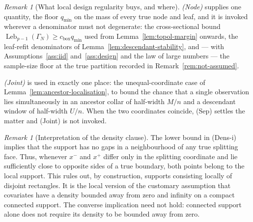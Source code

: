 \documentclass[11pt]{article}
\theoremstyle{plain}
\theoremstyle{definition}
\theoremstyle{remark}
\newtheorem{remark}[theorem]{Remark}
\begin{document}
\begin{remark}[What local design regularity buys, and where]
\emph{(Node)} supplies one quantity, the floor \(q_{\min}\) on the mass of
every true node and leaf, and it is invoked wherever a denominator must not
degenerate: the cross-sectional bound
\(\operatorname{Leb}_{p-1}(\Gamma_N)\ge c_{\mathrm{box}}q_{\min}\) used from
Lemma~\ref{lem:topol-margin} onwards, the leaf-refit denominators of
Lemma~\ref{lem:descendant-stability}, and --- with
Assumptions~\ref{ass:iid} and~\ref{ass:design} and the law of large numbers ---
the sample-size floor at the true partition recorded in
Remark~\ref{rem:not-assumed}.

\emph{(Joint)} is used in exactly one place: the unequal-coordinate case of
Lemma~\ref{lem:ancestor-localisation}, to bound the chance that a single
observation lies simultaneously in an ancestor collar of half-width \(M/n\)
and a descendant window of half-width \(U/n\). When the two coordinates
coincide, (Sep) settles the matter and (Joint) is not invoked.
\end{remark}

\begin{remark}[Interpretation of the density clause]\label{rem:dens-interpretation}
The lower bound in (Dens-i) implies that the support has no gaps in a
neighbourhood of any true splitting face.  Thus, whenever \(x^-\) and \(x^+\)
differ only in the splitting coordinate and lie sufficiently close to opposite
sides of a true boundary, both points belong to the local support.  This rules
out, by construction, supports consisting locally of disjoint rectangles.  It
is the local version of the customary assumption that covariates have a
density bounded away from zero and infinity on a compact connected support.
The converse implication need not hold: connected support alone does not
require its density to be bounded away from zero.
\end{remark}
\end{document}
